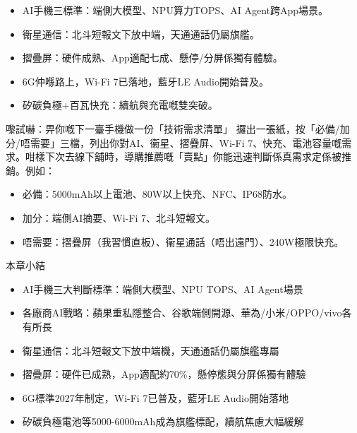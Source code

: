 \begin{itemize}
  \item AI手機三標準：端側大模型、NPU算力TOPS、AI Agent跨App場景。
  \item 衞星通信：北斗短報文下放中端，天通通話仍屬旗艦。
  \item 摺疊屏：硬件成熟、App適配七成、懸停/分屏係獨有體驗。
  \item 6G仲喺路上，Wi-Fi 7已落地，藍牙LE Audio開始普及。
  \item 矽碳負極+百瓦快充：續航與充電嘅雙突破。
\end{itemize}

\begin{tcbpractice}{嚟試嚇：畀你嘅下一臺手機做一份「技術需求清單」}
攞出一張紙，按「必備/加分/唔需要」三檔，列出你對AI、衞星、摺疊屏、Wi-Fi 7、快充、電池容量嘅需求。咁樣下次去線下舖時，導購推薦嘅「賣點」你能迅速判斷係真需求定係被推銷。例如：

\begin{itemize}
  \item 必備：5000mAh以上電池、80W以上快充、NFC、IP68防水。
  \item 加分：端側AI摘要、Wi-Fi 7、北斗短報文。
  \item 唔需要：摺疊屏（我習慣直板）、衞星通話（唔出遠門）、240W極限快充。
\end{itemize}

\end{tcbpractice}

\begin{tcbsummary}{本章小結}
\begin{itemize}
  \item AI手機三大判斷標準：端側大模型、NPU TOPS、AI Agent場景
  \item 各廠商AI戰略：蘋果重私隱整合、谷歌端側開源、華為/小米/OPPO/vivo各有所長
  \item 衞星通信：北斗短報文下放中端機，天通通話仍屬旗艦專屬
  \item 摺疊屏：硬件已成熟，App適配約70\%，懸停態與分屏係獨有體驗
  \item 6G標準2027年制定，Wi-Fi 7已普及，藍牙LE Audio開始落地
  \item 矽碳負極電池等5000-6000mAh成為旗艦標配，續航焦慮大幅緩解
\end{itemize}

\end{tcbsummary}
